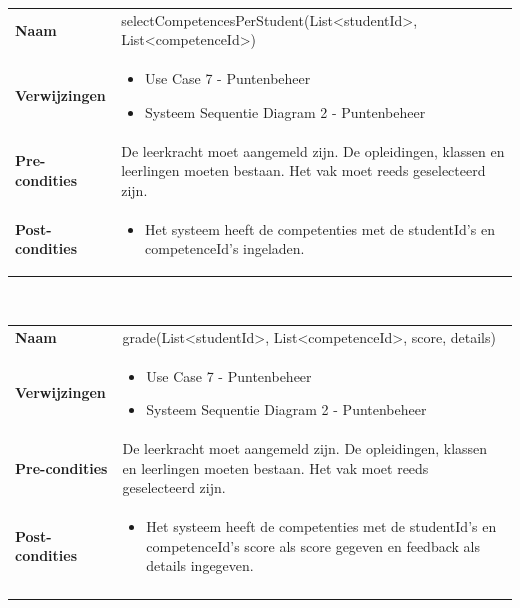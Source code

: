 \documentclass[a4paper]{article}
\begin{document}
\begin{tabularx}{\textwidth}{|l X|}
    \hline
    \textbf{Naam} & selectCompetencesPerStudent(List<studentId>, List<competenceId>) \\
    \textbf{Verwijzingen} & \begin{itemize}[leftmargin=*]
        \item Use Case 7 - Puntenbeheer
        \item Systeem Sequentie Diagram 2 - Puntenbeheer
    \end{itemize}\\
    \textbf{Pre-condities} & De leerkracht moet aangemeld zijn. De opleidingen, klassen en leerlingen moeten bestaan. Het vak moet reeds geselecteerd zijn.\\
    \textbf{Post-condities} & \begin{itemize}[leftmargin=*]
        \item Het systeem heeft de competenties met de studentId's en competenceId's ingeladen.
    \end{itemize}\\
    \hline
\end{tabularx}\\

\begin{tabularx}{\textwidth}{|l X|}
    \hline
    \textbf{Naam} & grade(List<studentId>, List<competenceId>, score, details) \\
    \textbf{Verwijzingen} & \begin{itemize}[leftmargin=*]
        \item Use Case 7 - Puntenbeheer
        \item Systeem Sequentie Diagram 2 - Puntenbeheer
    \end{itemize}\\
    \textbf{Pre-condities} & De leerkracht moet aangemeld zijn. De opleidingen, klassen en leerlingen moeten bestaan. Het vak moet reeds geselecteerd zijn.\\
    \textbf{Post-condities} & \begin{itemize}[leftmargin=*]
        \item Het systeem heeft de competenties met de studentId's en competenceId's score als score gegeven en feedback als details ingegeven.
    \end{itemize}\\
    \end{itemize}\\
    \hline
\end{tabularx}\\
\end{document}
